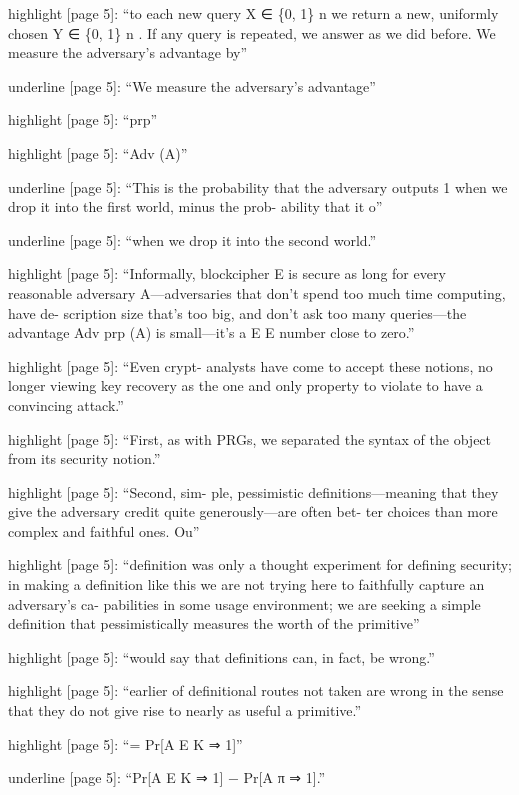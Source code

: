 highlight {[}page 5{]}: ``to each new query X ∈ \{0, 1\} n we return a
new, uniformly chosen Y ∈ \{0, 1\} n . If any query is repeated, we
answer as we did before. We measure the adversary's advantage by''

underline {[}page 5{]}: ``We measure the adversary's advantage''

highlight {[}page 5{]}: ``prp''

highlight {[}page 5{]}: ``Adv (A)''

underline {[}page 5{]}: ``This is the probability that the adversary
outputs 1 when we drop it into the first world, minus the prob- ability
that it o''

underline {[}page 5{]}: ``when we drop it into the second world.''

highlight {[}page 5{]}: ``Informally, blockcipher E is secure as long
for every reasonable adversary A---adversaries that don't spend too much
time computing, have de- scription size that's too big, and don't ask
too many queries---the advantage Adv prp (A) is small---it's a E E
number close to zero.''

highlight {[}page 5{]}: ``Even crypt- analysts have come to accept these
notions, no longer viewing key recovery as the one and only property to
violate to have a convincing attack.''

highlight {[}page 5{]}: ``First, as with PRGs, we separated the syntax
of the object from its security notion.''

highlight {[}page 5{]}: ``Second, sim- ple, pessimistic
definitions---meaning that they give the adversary credit quite
generously---are often bet- ter choices than more complex and faithful
ones. Ou''

highlight {[}page 5{]}: ``definition was only a thought experiment for
defining security; in making a definition like this we are not trying
here to faithfully capture an adversary's ca- pabilities in some usage
environment; we are seeking a simple definition that pessimistically
measures the worth of the primitive''

highlight {[}page 5{]}: ``would say that definitions can, in fact, be
wrong.''

highlight {[}page 5{]}: ``earlier of definitional routes not taken are
wrong in the sense that they do not give rise to nearly as useful a
primitive.''

highlight {[}page 5{]}: ``= Pr{[}A E K ⇒ 1{]}''

underline {[}page 5{]}: ``Pr{[}A E K ⇒ 1{]} − Pr{[}A π ⇒ 1{]}.''

